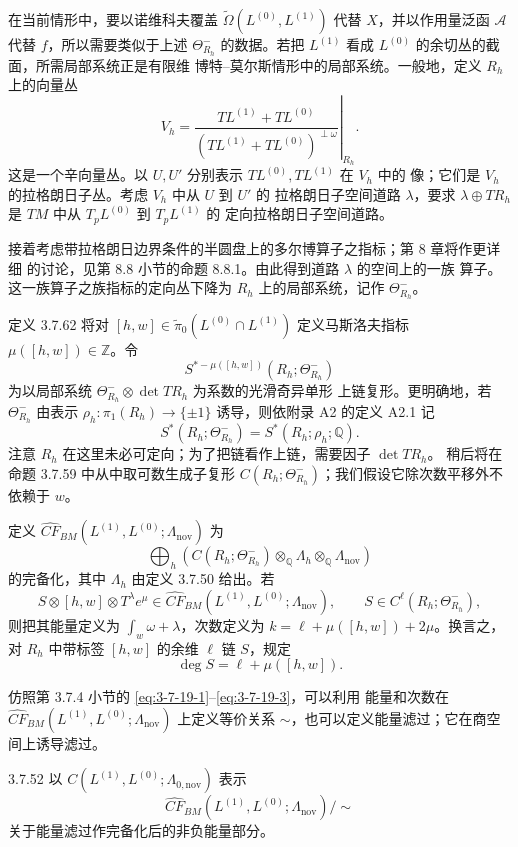 在当前情形中，要以诺维科夫覆盖
$\widetilde\Omega(L^{(0)},L^{(1)})$ 代替 $X$，并以作用量泛函
$\mathcal A$ 代替 $f$，所以需要类似于上述 $\Theta^-_{R_h}$ 的数据。若把
$L^{(1)}$ 看成 $L^{(0)}$ 的余切丛的截面，所需局部系统正是有限维
博特--莫尔斯情形中的局部系统。一般地，定义 $R_h$ 上的向量丛
\begin{equation}
 V_h
 =
 \left.
 \frac{TL^{(1)}+TL^{(0)}}
 {(TL^{(1)}+TL^{(0)})^{\perp\omega}}
 \right|_{R_h}.
\tag{3.7.51}\label{eq:3-7-51}
\end{equation}
这是一个辛向量丛。以 $U,U'$ 分别表示 $TL^{(0)},TL^{(1)}$ 在 $V_h$ 中的
像；它们是 $V_h$ 的拉格朗日子丛。考虑 $V_h$ 中从 $U$ 到 $U'$ 的
拉格朗日子空间道路 $\lambda$，要求
$\lambda\oplus TR_h$ 是 $TM$ 中从 $T_pL^{(0)}$ 到 $T_pL^{(1)}$ 的
定向拉格朗日子空间道路。

接着考虑带拉格朗日边界条件的半圆盘上的多尔博算子之指标；第 8 章将作更详细
的讨论，见第 8.8 小节的命题 8.8.1。由此得到道路 $\lambda$ 的空间上的一族
算子。这一族算子之族指标的定向丛下降为 $R_h$ 上的局部系统，记作
$\Theta^-_{R_h}$。

定义 3.7.62 将对
$[h,w]\in\widetilde\pi_0(L^{(0)}\cap L^{(1)})$ 定义马斯洛夫指标
$\mu([h,w])\in\mathbb Z$。令
\[
 S^{*-\mu([h,w])}(R_h;\Theta^-_{R_h})
\]
为以局部系统 $\Theta^-_{R_h}\otimes\det TR_h$ 为系数的光滑奇异单形
上链复形。更明确地，若 $\Theta^-_{R_h}$ 由表示
$\rho_h\colon\pi_1(R_h)\to\{\pm1\}$ 诱导，则依附录 A2 的定义 A2.1 记
\[
 S^*(R_h;\Theta^-_{R_h})=S^*(R_h;\rho_h;\mathbb Q).
\]
注意 $R_h$ 在这里未必可定向；为了把链看作上链，需要因子 $\det TR_h$。
稍后将在命题 3.7.59 中从中取可数生成子复形
$C(R_h;\Theta^-_{R_h})$；我们假设它除次数平移外不依赖于 $w$。

定义 $\widehat{CF}_{BM}(L^{(1)},L^{(0)};\Lambda_{\mathrm{nov}})$ 为
\[
 \bigoplus_h
 \left(
 C(R_h;\Theta^-_{R_h})
 \otimes_{\mathbb Q}\Lambda_h
 \otimes_{\mathbb Q}\Lambda_{\mathrm{nov}}
 \right)
\]
的完备化，其中 $\Lambda_h$ 由定义 3.7.50 给出。若
\[
 S\otimes[h,w]\otimes T^\lambda e^\mu
 \in\widehat{CF}_{BM}(L^{(1)},L^{(0)};\Lambda_{\mathrm{nov}}),
 \qquad S\in C^\ell(R_h;\Theta^-_{R_h}),
\]
则把其能量定义为 $\int_w\omega+\lambda$，次数定义为
$k=\ell+\mu([h,w])+2\mu$。换言之，对 $R_h$ 中带标签 $[h,w]$ 的余维
$\ell$ 链 $S$，规定
\[
 \deg S=\ell+\mu([h,w]).
\]

仿照第 3.7.4 小节的 \eqref{eq:3-7-19-1}--\eqref{eq:3-7-19-3}，可以利用
能量和次数在
$\widehat{CF}_{BM}(L^{(1)},L^{(0)};\Lambda_{\mathrm{nov}})$ 上定义等价关系
$\sim$，也可以定义能量滤过；它在商空间上诱导滤过。

\begin{definition}{3.7.52}\label{def:3-7-52}
以 $C(L^{(1)},L^{(0)};\Lambda_{0,\mathrm{nov}})$ 表示
\[
 \widehat{CF}_{BM}(L^{(1)},L^{(0)};\Lambda_{\mathrm{nov}})/\sim
\]
关于能量滤过作完备化后的非负能量部分。
\end{definition}

